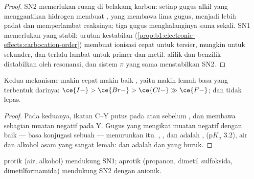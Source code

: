 \begin{proof}
SN2 memerlukan ruang di belakang karbon: setiap gugus alkil yang
menggantikan hidrogen membuat , yang membawa lima gugus,
menjadi lebih padat dan memperlambat reaksinya; tiga gugus menghalanginya
sama sekali. SN1 memerlukan  yang stabil: urutan kestabilan
(\cref{prop:b1:electronic-effects:carbocation-order}) membuat ionisasi
cepat untuk  tersier, mungkin untuk sekunder, dan terlalu
lambat untuk  primer dan metil.  alilik dan
benzilik distabilkan oleh resonansi, dan sistem $\pi$ yang sama
menstabilkan  SN2.
\end{proof}

\begin{proposition}\label{prop:b1:nucleophilic-substitution:leaving-group}
Kedua mekanisme makin cepat makin baik , yaitu makin lemah
basa yang terbentuk darinya: $\ce{I-} > \ce{Br-} > \ce{Cl-} \gg \ce{F-}$;
 dan  tidak lepas.
\end{proposition}

\begin{proof}
Pada keduanya, ikatan C--Y putus pada atau sebelum ,
dan  membawa sebagian muatan negatif pada Y. Gugus
yang mengikat muatan negatif dengan baik --- basa konjugasi sebuah  --- menurunkan  itu. , , dan
 adalah ,   ($\mathrm{p}K_a$ 3.2), air
dan alkohol asam yang sangat lemah:  dan  adalah  dan  yang buruk.
\end{proof}

\begin{proposition}[Pelarut]\label{prop:b1:nucleophilic-substitution:solvent}
 protik (air, alkohol) mendukung SN1;  aprotik
(propanon, dimetil sulfoksida, dimetilformamida) mendukung SN2 dengan
 anionik.
\end{proposition}

